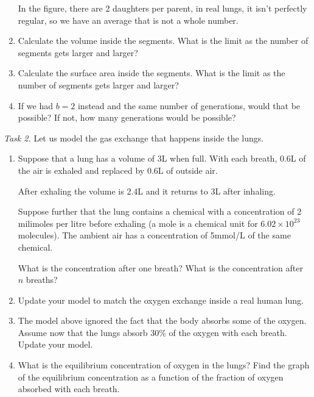 \begin{enumerate}[label=\emph{(\alph*)}]
		In the figure, there are 2 daughters per parent, in 	real lungs, it isn't perfectly regular, so we have an average that is not a whole number.
		
		
		
	\item Calculate the volume inside the segments. What is the limit as the number of segments gets larger and larger?
	\item Calculate the surface area inside the segments. What is the limit as the number of segments gets larger and larger?

	\item If we had $b=2$ instead and the same number of generations, would that be possible? If not, how many generations would be possible?
\end{enumerate}


\newpage
\emph{Task 2. } Let us model the gas exchange that happens inside the lungs.
\begin{enumerate}[label=\emph{(\alph*)}]
\item Suppose that a lung has a volume of 3L when full. With each breath, 0.6L of the air is exhaled and replaced by 0.6L of outside air.

	After exhaling the volume is 2.4L and it returns to 3L after inhaling.
	
	Suppose further that the lung contains a chemical with a concentration of 2 milimoles per litre before exhaling (a mole is a chemical unit for $6.02 \times 10^{23}$ molecules). The ambient air has a concentration of 5mmol/L of the same chemical.

	What is the concentration after one breath? What is the concentration after $n$ breaths?

\item Update your model to match the oxygen exchange inside a real human lung.
	
\item The model above ignored the fact that the body absorbs some of the oxygen. Assume now that the lungs absorb 30\% of the oxygen with each breath. Update your model.

\item What is the equilibrium concentration of oxygen in the lungs? Find the graph of the equilibrium concentration as a function of the fraction of oxygen absorbed with each breath.

\end{enumerate}

